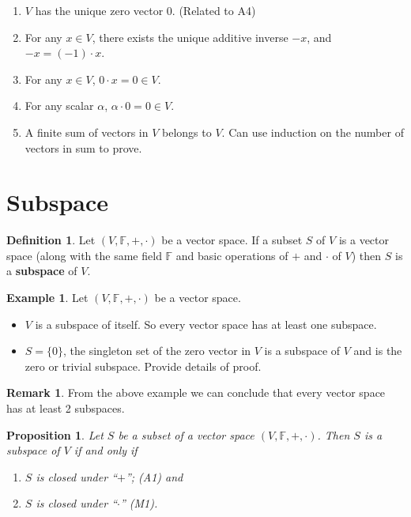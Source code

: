 \documentclass[12pt]{article}
\newtheorem*{proposition}{Proposition}
\theoremstyle{definition}
\newtheorem*{definition}{Definition}
\newtheorem*{example}{Example}
\newtheorem*{remark}{Remark}
\begin{document}
\begin{enumerate}
\item $V$ has the unique zero vector 0. (Related to A4)
\item For any $x \in V$, there exists the unique additive inverse $-x$, and $-x = (-1) \cdot x$.
\item For any $x \in V$, $0 \cdot x = 0 \in V$.
\item For any scalar $\alpha$, $\alpha \cdot 0 = 0 \in V$.
\item A finite sum of vectors in $V$ belongs to $V$. Can use induction on the number of vectors in
sum to prove.
\end{enumerate}

\section{Subspace}

\begin{definition}
Let $(V, \mathbb{F}, +, \cdot)$ be a vector space. If a subset $S$ of $V$ is a vector space (along with
the same field $\mathbb{F}$ and basic operations of $+$ and $\cdot$ of $V$) then $S$ is a \textbf{subspace}
of $V$.
\end{definition}

\begin{example}
Let $(V, \mathbb{F}, +, \cdot)$ be a vector space.
\begin{itemize}
\item $V$ is a subspace of itself. So every vector space has at least one subspace.
\item $S = \{0\}$, the singleton set of the zero vector in $V$ is a subspace of $V$ and is the zero
or trivial subspace. Provide details of proof.
\end{itemize}
\end{example}

\begin{remark}
From the above example we can conclude that every vector space has at least 2 subspaces.
\end{remark}

\begin{proposition}
Let $S$ be a subset of a vector space $(V, \mathbb{F}, +, \cdot)$. Then $S$ is a subspace of $V$
if and only if
\begin{enumerate}
\item $S$ is closed under ``$+$''; (A1) and
\item $S$ is closed under ``$\cdot$'' (M1).
\end{enumerate}
\end{proposition}
\end{document}
